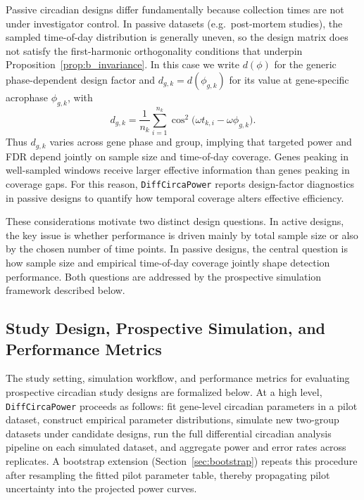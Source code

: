 \documentclass{article}
\newcommand{\software}[1]{\texttt{#1}}
\begin{document}
Passive circadian designs differ fundamentally because collection times are not
under investigator control. In passive datasets (e.g.\ post-mortem studies),
the sampled time-of-day distribution is generally uneven, so the design matrix
does not satisfy the first-harmonic orthogonality conditions that underpin
Proposition~\ref{prop:b_invariance}. In this case we write
$d(\phi)$ for the generic phase-dependent design factor and
$d_{g,k}=d(\phi_{g,k})$ for its value at gene-specific acrophase
$\phi_{g,k}$, with
\begin{equation}
d_{g,k}
=
\frac{1}{n_k}\sum_{i=1}^{n_k}
\cos^2\!\bigl(\omega t_{k,i}-\omega\phi_{g,k}\bigr).
\label{eq:design_factor}
\end{equation}
Thus $d_{g,k}$ varies across gene phase and group, implying that targeted power
and FDR depend jointly on sample size and time-of-day coverage. Genes peaking
in well-sampled windows receive larger effective information than genes peaking
in coverage gaps. For this reason, \software{DiffCircaPower} reports design-factor
diagnostics in passive designs to quantify how temporal coverage alters
effective efficiency.

These considerations motivate two distinct design questions. In active designs,
the key issue is whether performance is driven mainly by total sample size or
also by the chosen number of time points. In passive designs, the central
question is how sample size and empirical time-of-day coverage jointly shape
detection performance. Both questions are addressed by the prospective
simulation framework described below.



\subsection{Study Design, Prospective Simulation, and Performance Metrics}
\label{sec:study_design}

The study setting, simulation workflow, and performance metrics for
evaluating prospective circadian study designs are formalized below. At a high level,
\software{DiffCircaPower} proceeds as follows: fit gene-level circadian
parameters in a pilot dataset, construct empirical parameter distributions,
simulate new two-group datasets under candidate designs, run the full
differential circadian analysis pipeline on each simulated dataset, and
aggregate power and error rates across replicates. A bootstrap extension
(Section~\ref{sec:bootstrap}) repeats this procedure after resampling the
fitted pilot parameter table, thereby propagating pilot uncertainty into the
projected power curves.
\end{document}
